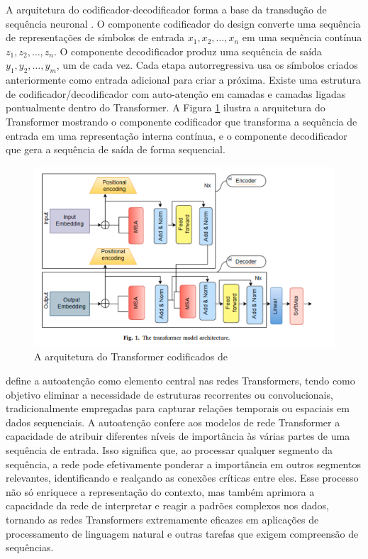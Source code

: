 A arquitetura do codificador-decodificador forma a base da transdução de sequência neuronal \cite{Vaswani2017}. O componente codificador do design converte uma sequência de representações de símbolos de entrada \(x_1, x_2, \ldots, x_n\) em uma sequência contínua \(z_1, z_2, \ldots, z_n\). O componente decodificador produz uma sequência de saída \(y_1, y_2, \ldots, y_m\), um de cada vez. Cada etapa autorregressiva usa os símbolos criados anteriormente como entrada adicional para criar a próxima. Existe uma estrutura de codificador/decodificador com auto-atenção em camadas e camadas ligadas pontualmente dentro do Transformer. A Figura \ref{fig:transformers} ilustra a arquitetura do Transformer mostrando o componente codificador que transforma a sequência de entrada em uma representação interna contínua, e o componente decodificador que gera a sequência de saída de forma sequencial.

\begin{figure}
    \centering
    \includegraphics[width=1.0\linewidth]{capitulos//figuras/image_transformer.png}
    \caption{A arquitetura do Transformer codificados de \textcite{THIRUNAVUKARASU2024100648}}
    \label{fig:transformers}
\end{figure}


\textcite{LIN2022111} define a autoatenção como elemento central nas redes Transformers, tendo como objetivo eliminar a necessidade de estruturas recorrentes ou convolucionais, tradicionalmente empregadas para capturar relações temporais ou espaciais em dados sequenciais. A autoatenção confere aos modelos de rede Transformer a capacidade de atribuir diferentes níveis de importância às várias partes de uma sequência de entrada. Isso significa que, ao processar qualquer segmento da sequência, a rede pode efetivamente ponderar a importância em outros segmentos relevantes, identificando e realçando as conexões críticas entre eles. Esse processo não só enriquece a representação do contexto, mas também aprimora a capacidade da rede de interpretar e reagir a padrões complexos nos dados, tornando as redes Transformers extremamente eficazes em aplicações de processamento de linguagem natural e outras tarefas que exigem compreensão de sequências.

